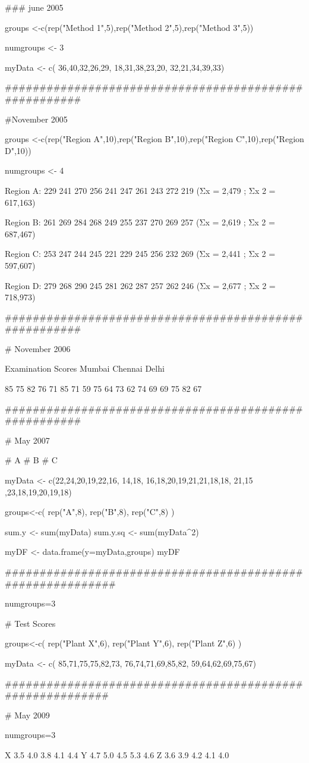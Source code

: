 ### june 2005

groups <-c(rep("Method 1",5),rep("Method 2",5),rep("Method 3",5))

numgroups <- 3

myData <- c(
36,40,32,26,29,
18,31,38,23,20,
32,21,34,39,33)

######################################################

#November 2005

groups <-c(rep("Region A",10),rep("Region B",10),rep("Region C",10),rep("Region D",10))

numgroups <- 4

Region A: 229 241 270 256 241 247 261 243 272 219
(Σx = 2,479 ; Σx 2 = 617,163) 

Region B: 261 269 284 268 249 255 237 270 269 257
(Σx = 2,619 ; Σx 2 = 687,467) 

Region C: 253 247 244 245 221 229 245 256 232 269
(Σx = 2,441 ; Σx 2 = 597,607) 

Region D: 279 268 290 245 281 262 287 257 262 246
(Σx = 2,677 ; Σx 2 = 718,973)


######################################################

# November 2006

Examination Scores
Mumbai
Chennai
Delhi

85
75
82
76
71
85
71
59
75
64
73
62
74
69
69
75
82
67

######################################################

# May 2007

# A
# B
# C

myData <- c(22,24,20,19,22,16, 14,18,
16,18,20,19,21,21,18,18,
21,15 ,23,18,19,20,19,18)


groups<-c(
rep("A",8),
rep("B",8),
rep("C",8)
) 

sum.y <- sum(myData)
sum.y.sq <- sum(myData^2)


myDF <- data.frame(y=myData,groups)
myDF %

###########################################################

numgroups=3

# Test Scores

groups<-c(
rep("Plant X",6),
rep("Plant Y",6),
rep("Plant Z",6)
)

myData <- c(
85,71,75,75,82,73,
76,74,71,69,85,82,
59,64,62,69,75,67)

##########################################################

# May 2009
 

numgroups=3 
 
X 3.5 4.0 3.8 4.1 4.4
Y 4.7 5.0 4.5 5.3 4.6
Z 3.6 3.9 4.2 4.1 4.0